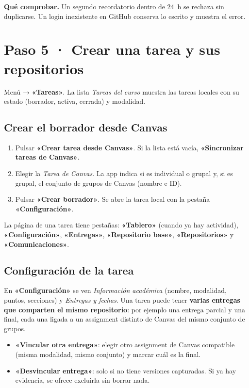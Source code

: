 \documentclass[11pt,a4paper]{article}
\newenvironment{comprobar}
  {\def\FrameCommand{\fcolorbox{verde}{verdefondo}}\MakeFramed{\advance\hsize-\width\FrameRestore}\noindent\textbf{\textcolor{verde}{Qué comprobar.}} }
  {\endMakeFramed}
\newcommand{\ui}[1]{\textbf{«#1»}}        %
\begin{document}
\begin{comprobar}
Un segundo recordatorio dentro de 24~h se rechaza sin duplicarse. Un login inexistente en GitHub conserva lo escrito y muestra el error.
\end{comprobar}

\section{Paso 5 · Crear una tarea y sus repositorios}

Menú → \ui{Tareas}. La lista \emph{Tareas del curso} muestra las tareas locales con su estado (borrador, activa, cerrada) y modalidad.

\subsection{Crear el borrador desde Canvas}

\begin{enumerate}
  \item Pulsar \ui{Crear tarea desde Canvas}. Si la lista está vacía, \ui{Sincronizar tareas de Canvas}.
  \item Elegir la \emph{Tarea de Canvas}. La app indica si es individual o grupal y, si es grupal, el conjunto de grupos de Canvas (nombre e ID).
  \item Pulsar \ui{Crear borrador}. Se abre la tarea local con la pestaña \ui{Configuración}.
\end{enumerate}

La página de una tarea tiene pestañas: \ui{Tablero} (cuando ya hay actividad), \ui{Configuración}, \ui{Entregas}, \ui{Repositorio base}, \ui{Repositorios} y \ui{Comunicaciones}.

\subsection{Configuración de la tarea}

En \ui{Configuración} se ven \emph{Información académica} (nombre, modalidad, puntos, secciones) y \emph{Entregas y fechas}. Una tarea puede tener \textbf{varias entregas que comparten el mismo repositorio}: por ejemplo una entrega parcial y una final, cada una ligada a un assignment distinto de Canvas del mismo conjunto de grupos.

\begin{itemize}
  \item \ui{Vincular otra entrega}: elegir otro assignment de Canvas compatible (misma modalidad, mismo conjunto) y marcar cuál es la final.
  \item \ui{Desvincular entrega}: solo si no tiene versiones capturadas. Si ya hay evidencia, se ofrece excluirla sin borrar nada.
\end{itemize}
\end{document}
